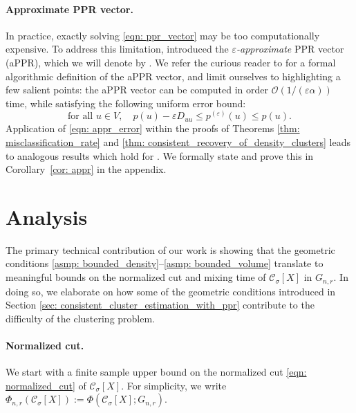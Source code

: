 \documentclass[11pt,twoside]{article}
\newcommand{\1}{\mathbf{1}}
\newcommand{\pbf}{p}        %
\newcommand{\Xbf}{X}             %
\newcommand{\Dbf}{D}
\newcommand{\Cset}{\mathcal{C}}
\newcommand{\Csig}{\Cset_{\sigma}}
\begin{document}
\paragraph{Approximate PPR vector.}  In practice, exactly solving \eqref{eqn:
  ppr_vector} may be too computationally expensive. To address this limitation,
\citet{andersen2006} introduced the \emph{$\varepsilon$-approximate} PPR vector
(aPPR), which we will denote by \smash{$\pbf^{(\varepsilon)}$}. We refer the
curious reader to \citet{andersen2006} for a formal algorithmic definition of
the aPPR vector, and limit ourselves to highlighting a few salient points: the
aPPR vector can be computed in order $\mathcal{O}(1/(\varepsilon\alpha))$ time,
while satisfying the following uniform error bound: 
\begin{equation}
\label{eqn: appr_error}
\textrm{for all $u \in V$}, \quad \pbf(u) - \varepsilon \Dbf_{uu}\leq
\pbf^{(\varepsilon)}(u) \leq \pbf(u).  
\end{equation}
Application of \eqref{eqn: appr_error} within the proofs of Theorems \ref{thm:
  misclassification_rate} and \ref{thm: consistent_recovery_of_density_clusters}
leads to analogous results which hold for \smash{$\pbf^{(\varepsilon)}$}. We
formally state and prove this in Corollary~\ref{cor: appr} in 
the appendix. 

\section{Analysis}
\label{sec: analysis}

The primary technical contribution of our work is showing that the geometric
conditions \ref{asmp: bounded_density}--\ref{asmp: bounded_volume} translate to 
meaningful bounds on the normalized cut and mixing time of $\Csig[\Xbf]$ in
$G_{n,r}$. In doing so, we elaborate on how some of the geometric conditions
introduced in Section \ref{sec: consistent_cluster_estimation_with_ppr}
contribute to the difficulty of the clustering problem. 

\paragraph{Normalized cut.} We start with a finite sample upper bound on the
normalized cut \eqref{eqn: normalized_cut} of $\Cset_\sigma[\Xbf]$. For
simplicity, we write $\Phi_{n,r}(\Csig[\Xbf]) := \Phi(\Csig[\Xbf]; G_{n,r})$. 
\end{document}
